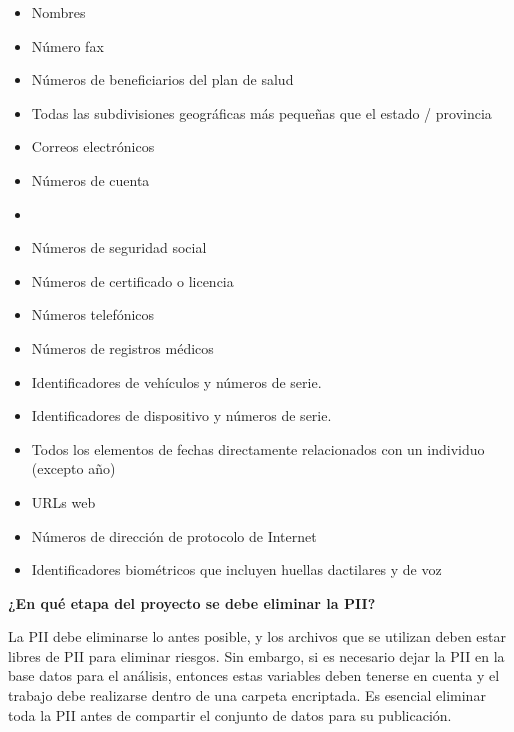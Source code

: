 \documentclass[11pt,en]{elegantpaper}
\begin{document}
\begin{multicols}{3}

\begin{itemize}
	\item Nombres
	
	\item Número fax
	
	\item Números de beneficiarios del plan de salud
	
	\item Todas las subdivisiones geográficas más pequeñas que el estado / provincia
	
	\item Correos electrónicos
	
	\item Números de cuenta
	
	\item[\vspace{\fill}]
	
	\item Números de seguridad social
	
	\item Números de certificado o licencia
	
	\item Números telefónicos
	
	\item Números de registros médicos
	
	\item Identificadores de vehículos y números de serie.
	
	\item Identificadores de dispositivo y números de serie.

	\item Todos los elementos de fechas directamente relacionados con un individuo (excepto año)
		
	\item URLs web
	
	\item Números de dirección de protocolo de Internet
	
	\item Identificadores biométricos que incluyen huellas dactilares y de voz 
	
\end{itemize}
\end{multicols}

\noindent
\textbf{¿En qué etapa del proyecto se debe eliminar la PII?}

La PII debe eliminarse lo antes posible, y los archivos que se utilizan deben estar libres de PII para eliminar riesgos. Sin embargo, si es necesario dejar la PII en la base datos para el análisis, entonces estas variables deben tenerse en cuenta y el trabajo debe realizarse dentro de una carpeta encriptada. Es esencial eliminar toda la PII antes de compartir el conjunto de datos para su publicación.
\end{document}
